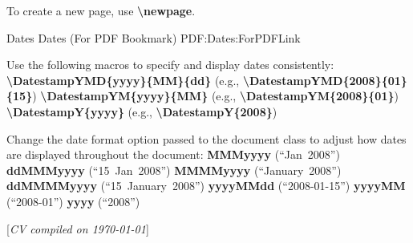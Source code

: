 \documentclass[letterpaper,MMMyyyy,nonstopmode]{simpleresumecv}
\newcommand{\CVNote}{CV compiled on {\today}}
\newcommand{\Code}[1]{\mbox{\textbf{#1}}}
\newcommand{\CodeCommand}[1]{\mbox{\textbf{\textbackslash{#1}}}}
\begin{document}
\begin{Body}
{\Gap
\BulletItem
To create a new page, use \CodeCommand{newpage}.

\BigGap
\SubSection
{Dates}
{Dates (For PDF Bookmark)}
{PDF:Dates:ForPDFLink}

\Gap
\BulletItem
Use the following macros to specify and display dates consistently:
\SubBulletItem
\CodeCommand{DatestampYMD\{yyyy\}\{MM\}\{dd\}}
(e.g., \CodeCommand{DatestampYMD\{2008\}\{01\}\{15\}})
\SubBulletItem
\CodeCommand{DatestampYM\{yyyy\}\{MM\}}
(e.g., \CodeCommand{DatestampYM\{2008\}\{01\}})
\SubBulletItem
\CodeCommand{DatestampY\{yyyy\}}
(e.g., \CodeCommand{DatestampY\{2008\}})

\Gap
\BulletItem
Change the date format option passed to the document class to adjust how dates are displayed throughout the document:
\SubBulletItem
\Code{MMMyyyy} (``Jan~2008'')
\SubBulletItem
\Code{ddMMMyyyy} (``15~Jan~2008'')
\SubBulletItem
\Code{MMMMyyyy} (``January~2008'')
\SubBulletItem
\Code{ddMMMMyyyy} (``15~January~2008'')
\SubBulletItem
\Code{yyyyMMdd} (``2008-01-15'')
\SubBulletItem
\Code{yyyyMM} (``2008-01'')
\SubBulletItem
\Code{yyyy} (``2008'')

\endgroup

\fi

\end{Body}


\UseNoteFont%
\null\hfill%
[\textit{\CVNote}]
\end{document}
